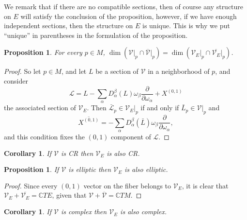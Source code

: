 \documentclass[11pt]{amsart}
\newcommand{\crb}{\mathcal{V}}
\newcommand{\C}{\mathbb{C}}
\newcommand{\dop}[1]{\frac{\partial}{\partial #1}}
\DeclareMathOperator{\crdim}{\dim_{\rm CR}}
\theoremstyle{definition}
\theoremstyle{remark}
\theoremstyle{plain}
\newtheorem{prop}[defn]{Proposition}
\newtheorem{cor}[defn]{Corollary}
\begin{document}
We remark that if there are no compatible sections, then of course any structure on $E$ will satisfy
the conclusion of the proposition, however, if we have enough independent sections, then the structure on $E$ is unique. This  is why we put ``unique'' in parentheses in the formulation of the proposition.
% 

\begin{prop}
For every $p \in M$, $\dim \left(\mathcal{V}\big|_p \cap \overline{\mathcal{V}}\big|_p\right) = \dim \left(\mathcal{V}_E\big|_p \cap \overline{\mathcal{V}_E}\big|_p\right)$.
\end{prop}
%
\begin{proof}
So let $p \in M$, and let $L$ be a section of $\mathcal{V}$ in a neighborhood of $p$, and consider 
%
\[ \mathcal{L} =  L - \sum_{\alpha} D^\beta_{\alpha} ( L) \omega_\beta \dop{\omega_\alpha} + X^{(0,1)}\]
%
the associated section of $\mathcal{V}_E$. Then $\bar{\mathcal{L}}_p \in \mathcal{V}_E\big|_p$ if and only if $\bar{L}_p \in \mathcal{V}\big|_p$ and 
%
\[ \overline{X^{(0,1)}} = - \sum_{\alpha} D^\beta_{\alpha} ( \bar{L}) \omega_\beta \dop{\omega_\alpha},\]
%
and this condition fixes the $(0,1)$ component of $\mathcal{L}$.
\end{proof}
%
\begin{cor}
If $\mathcal{V}$ is CR then $\mathcal{V}_E$ is also CR.
\end{cor}
%
\begin{prop}
If $\mathcal{V}$ is elliptic then $\mathcal{V}_E$ is also elliptic.
\end{prop}
%
\begin{proof}
Since every $(0,1)$ vector on the fiber belongs to $\mathcal{V}_E$, it is clear that $\mathcal{V}_E + \overline{\mathcal{V}_E} = \mathbb{C} T E$, given that $\mathcal{V} + \overline{\mathcal{V}} = \mathbb{C} T M$.
\end{proof}
%
\begin{cor}
If $\mathcal{V}$ is complex then $\mathcal{V}_E$ is also complex.
\end{cor}



\end{document}
